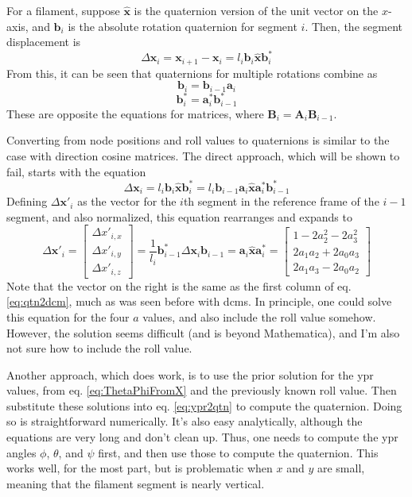 \documentclass {scrbook}
\begin{document}
For a filament, suppose $\hat{\bm{x}}$ is the quaternion version of the unit vector on the $x$-axis, and $\bm{b}_i$ is the absolute rotation quaternion for segment $i$. Then, the segment displacement is
$$\Delta \bm{x}_i = \bm{x}_{i+1}-\bm{x}_i = l_i \bm{b}_i \hat{\bm{x}} \bm{b}^*_i$$
From this, it can be seen that quaternions for multiple rotations combine as
$$\bm{b}_i = \bm{b}_{i-1} \bm{a}_i$$
$$\bm{b}_i^* = \bm{a}_i^* \bm{b}_{i-1}^*$$
These are opposite the equations for matrices, where $\bm{B}_i=\bm{A}_i\bm{B}_{i-1}$.

Converting from node positions and roll values to quaternions is similar to the case with direction cosine matrices. The direct approach, which will be shown to fail, starts with the equation
$$\Delta \bm{x}_i = l_i \bm{b}_i \hat{\bm{x}} \bm{b}^*_i = l_i \bm{b}_{i-1} \bm{a}_i \hat{\bm{x}} \bm{a}^*_i \bm{b}^*_{i-1}$$
Defining $\Delta \bm{x}'_i$ as the vector for the $i$th segment in the reference frame of the $i-1$ segment, and also normalized, this equation rearranges and expands to
$$\Delta \bm{x}'_i
=\left[ \begin{array}{c} \Delta x'_{i,x} \\ \Delta x'_{i,y} \\ \Delta x'_{i,z} \end{array} \right]
= \frac{1}{l_i} \bm{b}^*_{i-1} \Delta \bm{x}_i \bm{b}_{i-1} = \bm{a}_i \hat{\bm{x}} \bm{a}^*_i 
= \left[ \begin{array}{c} 1-2a_2^2-2a_3^2 \\ 2a_1a_2 + 2a_0a_3 \\ 2a_1a_3-2a_0a_2  \end{array} \right]$$
Note that the vector on the right is the same as the first column of eq. \ref{eq:qtn2dcm}, much as was seen before with dcms. In principle, one could solve this equation for the four $a$ values, and also include the roll value somehow. However, the solution seems difficult (and is beyond Mathematica), and I'm also not sure how to include the roll value.

Another approach, which does work, is to use the prior solution for the ypr values, from eq. \ref{eq:ThetaPhiFromX} and the previously known roll value. Then substitute these solutions into eq. \ref{eq:ypr2qtn} to compute the quaternion. Doing so is straightforward numerically. It's also easy analytically, although the equations are very long and don't clean up. Thus, one needs to compute the ypr angles $\phi$, $\theta$, and $\psi$ first, and then use those to compute the quaternion. This works well, for the most part, but is problematic when $x$ and $y$ are small, meaning that the filament segment is nearly vertical.
\end{document}
